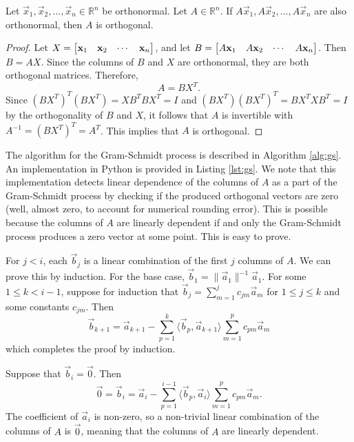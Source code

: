 \documentclass{homework}
\begin{document}
	\maketitle
	
	\question
	
	\question Let $\vec{x}_1,\vec{x}_2, \dots,\vec{x}_n\in\mathbb{R}^n$ be orthonormal. Let $A \in \mathbb{R}^n$. If $A\vec{x}_1, A\vec{x}_2,\dots, A\vec{x}_n$ are also orthonormal, then $A$ is orthogonal.
	
	\begin{proof}
		Let $X = \left[\begin{matrix}\mathbf{x}_1 & \mathbf{x}_2 & \cdots & \mathbf{x}_n\end{matrix}\right]$, and let $B = \left[\begin{matrix}A\mathbf{x}_1 & A\mathbf{x}_2 & \cdots & A\mathbf{x}_n\end{matrix}\right]$. Then $B = AX$. Since the columns of $B$ and $X$ are orthonormal, they are both orthogonal matrices. Therefore,
		\begin{equation*}
			A = BX^T.
		\end{equation*}
		Since $(BX^T)^T(BX^T) = XB^TBX^T = I$ and $(BX^T)(BX^T)^T = BX^TXB^T = I$ by the orthogonality of $B$ and $X$, it follows that $A$ is invertible with $A^{-1} = (BX^T)^T = A^T$. This implies that $A$ is orthogonal.
	\end{proof}
	
	\question The algorithm for the Gram-Schmidt process is described in Algorithm \ref{alg:gs}. An implementation in Python is provided in Listing \ref{lst:gs}. We note that this implementation detects linear dependence of the columns of $A$ as a part of the Gram-Schmidt process by checking if the produced orthogonal vectors are zero (well, almost zero, to account for numerical rounding error). This is possible because the columns of $A$ are linearly dependent if and only the Gram-Schmidt process produces a zero vector at some point. This is easy to prove.
	
	For $j < i$, each $\vec{b}_j$ is a linear combination of the first $j$ columns of $A$. We can prove this by induction. For the base case, $\vec{b}_1 = \lVert\vec{a}_1\rVert^{-1}\vec{a}_1$. For some $1 \le k < i-1$, suppose for induction that $\vec{b}_j = \sum\limits_{m=1}^jc_{jm}\vec{a}_m$ for $1 \le j \le k$ and some constants $c_{jm}$. Then
	\begin{equation*}
		\vec{b}_{k+1} = \vec{a}_{k+1} - \sum_{p=1}^k \langle\vec{b}_p,\vec{a}_{k+1}\rangle \sum_{m=1}^p c_{pm}\vec{a}_m
	\end{equation*}
	which completes the proof by induction.
	
	Suppose that $\vec{b}_i = \vec{0}$. Then
	\begin{equation*}
		\vec{0} = \vec{b}_i = \vec{a}_i - \sum_{p=1}^{i-1}\langle\vec{b}_p, \vec{a}_i\rangle \sum_{m=1}^pc_{pm}\vec{a}_m.
	\end{equation*}
	The coefficient of $\vec{a}_i$ is non-zero, so a non-trivial linear combination of the columns of $A$ is $\vec{0}$, meaning that the columns of $A$ are linearly dependent.
	
\end{document}
